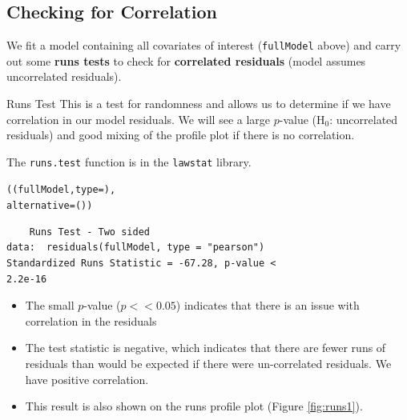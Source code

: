 \subsection{Checking for Correlation}

\begin{knitrout}\footnotesize
{}\color{fgcolor}
\end{knitrout}

\begin{frame}[fragile]
We fit a model containing all covariates of interest ({\tt fullModel} above) and carry out some \textbf{runs tests} to check for \textbf{correlated residuals} (model assumes uncorrelated residuals).

\begin{block}{Runs Test}
This is a test for randomness and allows us to determine if we have correlation in our model residuals. We will see a large $p$-value (H$_0$: uncorrelated residuals) and good mixing of the profile plot if there is no correlation.
\end{block}

\end{frame}

\begin{frame}[fragile]
\noindent The {\tt runs.test} function is in the {\tt lawstat} library.
\begin{knitrout}\footnotesize
{}\color{fgcolor}\begin{kframe}
\begin{alltt}
((fullModel, type = ), 
alternative = ())
\end{alltt}
\begin{verbatim}
	Runs Test - Two sided
data:  residuals(fullModel, type = "pearson") 
Standardized Runs Statistic = -67.28, p-value <
2.2e-16
\end{verbatim}
\end{kframe}
\end{knitrout}

\begin{itemize}
\item The small $p$-value ($p << 0.05$) indicates that there is an issue with correlation in the residuals
\item The test statistic is negative, which indicates that there are fewer runs of residuals than would be expected if there were un-correlated residuals.  We have positive correlation.
\item This result is also shown on the runs profile plot (Figure \ref{fig:runs1}).
\end{itemize}
\end{frame}

